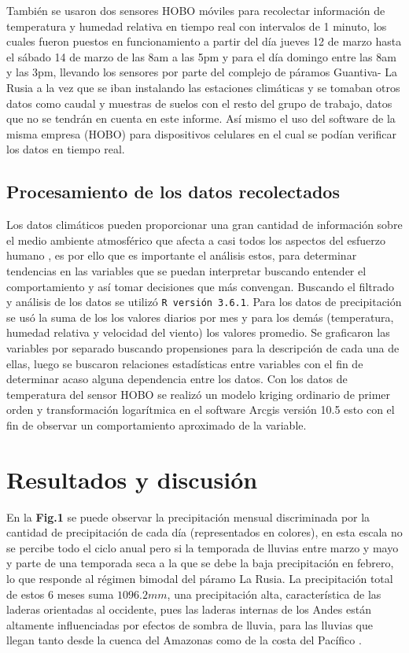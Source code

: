 \documentclass[conference,final,]{IEEEtran}
\begin{document}
También se usaron dos sensores HOBO móviles para recolectar información
de temperatura y humedad relativa en tiempo real con intervalos de 1
minuto, los cuales fueron puestos en funcionamiento a partir del día
jueves 12 de marzo hasta el sábado 14 de marzo de las 8am a las 5pm y
para el día domingo entre las 8am y las 3pm, llevando los sensores por
parte del complejo de páramos Guantiva- La Rusia a la vez que se iban
instalando las estaciones climáticas y se tomaban otros datos como
caudal y muestras de suelos con el resto del grupo de trabajo, datos que
no se tendrán en cuenta en este informe. Así mismo el uso del software
de la misma empresa (HOBO) para dispositivos celulares en el cual se
podían verificar los datos en tiempo real.

\hypertarget{procesamiento-de-los-datos-recolectados}{%
\subsection{Procesamiento de los datos
recolectados}\label{procesamiento-de-los-datos-recolectados}}

Los datos climáticos pueden proporcionar una gran cantidad de
información sobre el medio ambiente atmosférico que afecta a casi todos
los aspectos del esfuerzo humano \cite{Bala}, es por ello que es
importante el análisis estos, para determinar tendencias en las
variables que se puedan interpretar buscando entender el comportamiento
y así tomar decisiones que más convengan. Buscando el filtrado y
análisis de los datos se utilizó \texttt{R\ versión\ 3.6.1}. Para los
datos de precipitación se usó la suma de los los valores diarios por mes
y para los demás (temperatura, humedad relativa y velocidad del viento)
los valores promedio. Se graficaron las variables por separado buscando
propensiones para la descripción de cada una de ellas, luego se buscaron
relaciones estadísticas entre variables con el fin de determinar acaso
alguna dependencia entre los datos. Con los datos de temperatura del
sensor HOBO se realizó un modelo kriging ordinario de primer orden y
transformación logarítmica en el software Arcgis versión 10.5 esto con
el fin de observar un comportamiento aproximado de la variable.

\hypertarget{resultados-y-discusiuxf3n}{%
\section{Resultados y discusión}\label{resultados-y-discusiuxf3n}}

En la \textbf{Fig.1} se puede observar la precipitación mensual
discriminada por la cantidad de precipitación de cada día (representados
en colores), en esta escala no se percibe todo el ciclo anual pero si la
temporada de lluvias entre marzo y mayo y parte de una temporada seca a
la que se debe la baja precipitación en febrero, lo que responde al
régimen bimodal del páramo La Rusia. La precipitación total de estos 6
meses suma \(1096.2mm\), una precipitación alta, característica de las
laderas orientadas al occidente, pues las laderas internas de los Andes
están altamente influenciadas por efectos de sombra de lluvia, para las
lluvias que llegan tanto desde la cuenca del Amazonas como de la costa
del Pacífico \cite{buytaert2006hidrologia}.
\end{document}
